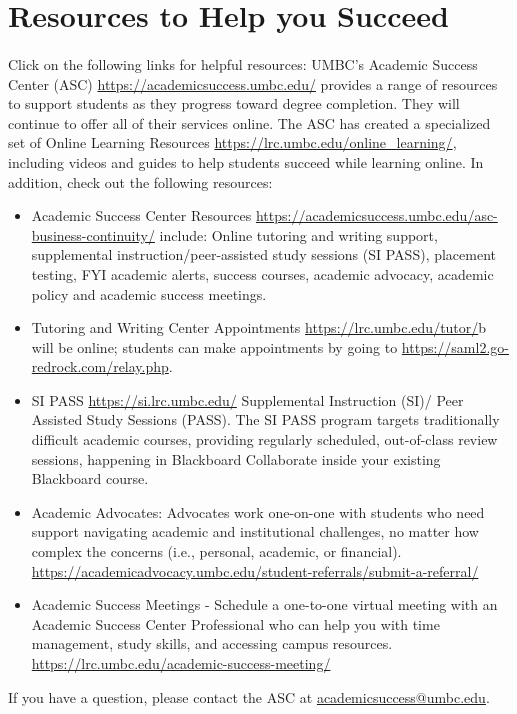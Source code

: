\documentclass[letter,10pt]{article}
\begin{document}
\section*{Resources to Help you Succeed}
\paragraph{}Click on the following links for helpful resources:
UMBC’s Academic Success Center (ASC) \url{https://academicsuccess.umbc.edu/} provides a range of resources to support students as they progress toward degree completion. They will continue to offer all of their services online.
The ASC has created a specialized set of Online Learning Resources \url{https://lrc.umbc.edu/online_learning/}, including videos and guides to help students succeed while learning online.
In addition, check out the following resources:

\begin{itemize}
\item Academic Success Center Resources \url{https://academicsuccess.umbc.edu/asc-business-continuity/} include: Online tutoring and writing support, supplemental instruction/peer-assisted study sessions (SI PASS), placement testing, FYI academic alerts, success courses, academic advocacy, academic policy and academic success meetings.

\item Tutoring and Writing Center Appointments \url{https://lrc.umbc.edu/tutor/}b will be online; students can make appointments by going to \url{https://saml2.go-redrock.com/relay.php}.

\item SI PASS \url{https://si.lrc.umbc.edu/} Supplemental Instruction (SI)/ Peer Assisted Study Sessions (PASS). The SI PASS program targets traditionally difficult academic courses, providing regularly scheduled, out-of-class review sessions, happening in Blackboard Collaborate inside your existing Blackboard course.

\item Academic Advocates: Advocates work one-on-one with students who need support navigating academic and institutional challenges, no matter how complex the concerns (i.e., personal, academic, or financial). \url{https://academicadvocacy.umbc.edu/student-referrals/submit-a-referral/}

\item Academic Success Meetings - Schedule a one-to-one virtual meeting with an Academic Success Center Professional who can help you with time management, study skills, and accessing campus resources. \url{https://lrc.umbc.edu/academic-success-meeting/}

\end{itemize}

If you have a question, please contact the ASC at \href{mailto:academicsuccess@umbc.edu}{academicsuccess@umbc.edu}.
\end{document}

